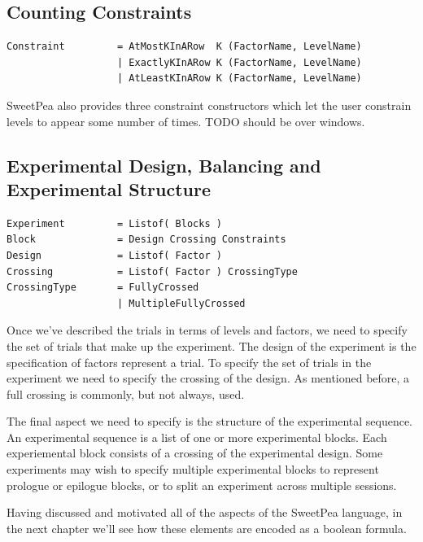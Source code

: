 \subsection{Counting Constraints}
\begin{verbatim}
Constraint         = AtMostKInARow  K (FactorName, LevelName)
                   | ExactlyKInARow K (FactorName, LevelName)
                   | AtLeastKInARow K (FactorName, LevelName)
\end{verbatim}

SweetPea also provides three constraint constructors which let the user constrain levels to appear some number of times. TODO should be over windows.

\subsection{Experimental Design, Balancing and Experimental Structure}

\begin{verbatim}
Experiment         = Listof( Blocks )
Block              = Design Crossing Constraints
Design             = Listof( Factor )
Crossing           = Listof( Factor ) CrossingType
CrossingType       = FullyCrossed
                   | MultipleFullyCrossed
\end{verbatim}


Once we've described the trials in terms of levels and factors, we need to specify the set of trials that make up the experiment. The design of the experiment is the specification of factors represent a trial. To specify the set of trials in the experiment we need to specify the crossing of the design. As mentioned before, a full crossing is commonly, but not always, used.

The final aspect we need to specify is the structure of the experimental sequence. An experimental sequence is a list of one or more experimental blocks. Each experiemental block consists of a crossing of the experimental design. Some experiments may wish to specify multiple experimental blocks to represent prologue or epilogue blocks, or to split an experiment across multiple sessions.

Having discussed and motivated all of the aspects of the SweetPea language, in the next chapter we'll see how these elements are encoded as a boolean formula.
